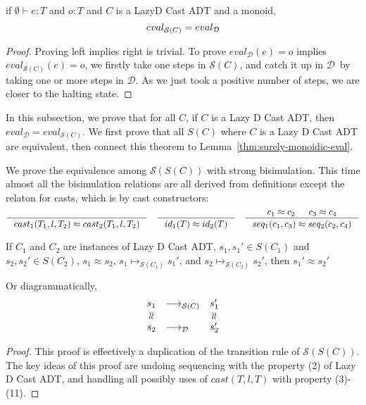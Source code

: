 \documentclass[acmsmall,review,anonymous]{acmart}\settopmatter{printfolios=true,printccs=false,printacmref=false}
\newcommand{\judgetype}[3]{#1 \vdash #2 : #3}
\newcommand{\lazyD}{Lazy\;D}
\newcommand{\judgeSreduce}[3]{#2 \longmapsto_{\mathcal{S}(#1)} #3}
\newcommand{\judgeSeval}[3]{eval_{\mathcal{S}(#1)}(#2) = #3}
\newcommand{\ineffCEKD}{$\mathcal{D}$}
\newcommand{\judgeDeval}[2]{eval_{\mathcal{D}}(#1) = #2}
\newcommand{\effCEK}[1]{$\mathcal{S}(#1)$}
\newcommand{\evalEqv}[2]{\ensuremath{eval_{\text{#1}} = eval_{\text{#2}}}}
\begin{document}
\begin{proposition}[Correctness of \effCEK{C}]
	\label{thm:surely-monoidic-eval}
	if $\judgetype{\emptyset}{e}{T}$ and $o : T$ and $C$ is a 
	\lazyD{} Cast ADT and a monoid,
	\[
	\text{\evalEqv{\effCEK{C}}{\ineffCEKD}}
	\]
\end{proposition}
\begin{proof}Proving left implies right is trivial.
To prove $\judgeDeval{e}{o}$ implies $\judgeSeval{C}{e}{o}$, 
we firstly take one steps in \effCEK{C}, and catch it up in \ineffCEKD\ by 
taking one or more steps in \ineffCEKD. As we just took a positive number of 
steps, we are closer to the halting state.
\end{proof}


In this subsection, we prove that for all $C$, if $C$ is a Lazy D Cast ADT, 
then \evalEqv{\ineffCEKD}{\effCEK{C}}. We first 
prove that all $S(C)$ where $C$ is a Lazy D Cast ADT are equivalent, then 
connect this theorem to Lemma~\ref{thm:surely-monoidic-eval}.

We prove the equivalence among \effCEK{S(C)} with strong bisimulation. This 
time almost all the bisimulation relations are all derived from definitions 
except the relaton for casts, which is by cast constructors:
\begin{gather*}
\inference{
}{
	cast_1(T_1,l,T_2) \approx cast_2(T_1,l,T_2)
}
\quad
\inference{
}{
	id_1(T) \approx id_2(T)
}
\quad
\inference{
	c_1 \approx c_2 &
	c_3 \approx c_4
}{
	seq_1(c_1,c_3) \approx seq_2(c_2,c_4)
}
\end{gather*}

\begin{lemma}
	\label{thm:CEKS-bisim}
	If 
	$C_1$ and $C_2$ are instances of Lazy D Cast ADT,
	$s_1, s_1' \in S(C_1)$ and $s_2,s_2' \in S(C_2)$,
	$s_1 \approx s_2$,
	$\judgeSreduce{C_1}{s_1}{s_1'}$, and
	$\judgeSreduce{C_2}{s_2}{s_2'}$, then 
	$s_1' \approx s_2'$
	
	Or diagrammatically, 
	\[\begin{array}{clc}
	s_{1} & \longrightarrow_{\text{\effCEK{C}}} & s_1'\\
	\rotatebox[origin=c]{90}{$\approx$} 
	& & \rotatebox[origin=c]{90}{$\approx$} \\
	s_{2} & 
	\longrightarrow_{\text{\ineffCEKD}} & s_2' \\
	\end{array}\]
\end{lemma}
\begin{proof} 
	This proof is effectively a duplication of the transition rule of 
	\effCEK{S(C)}.
	The key ideas of this proof are undoing sequencing with the property (2) of 
	Lazy D Cast ADT, and handling all possibly uses of $
	cast(T,l,T)$ with property (3)-(11).
\end{proof}
\end{document}
